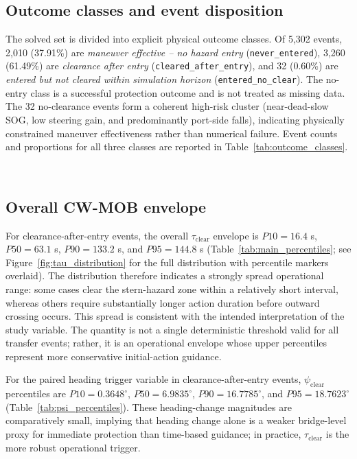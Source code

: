 \documentclass[preprint,12pt]{elsarticle}
\begin{document}
\subsection{Outcome classes and event disposition}
The solved set is divided into explicit physical outcome classes. Of 5{,}302 events, 2{,}010 (37.91\%) are \emph{maneuver effective -- no hazard entry} (\texttt{never\_entered}), 3{,}260 (61.49\%) are \emph{clearance after entry} (\texttt{cleared\_after\_entry}), and 32 (0.60\%) are \emph{entered but not cleared within simulation horizon} (\texttt{entered\_no\_clear}). The no-entry class is a successful protection outcome and is not treated as missing data.
The 32 no-clearance events form a coherent high-risk cluster (near-dead-slow SOG, low steering gain, and predominantly port-side falls), indicating physically constrained maneuver effectiveness rather than numerical failure. Event counts and proportions for all three classes are reported in Table~\ref{tab:outcome_classes}.

\begin{table}[H]
\centering
{}\
\caption{Outcome-class summary for eligible scenarios.}
\label{tab:outcome_classes}
\end{table}

\subsection{Overall CW-MOB envelope}
For clearance-after-entry events, the overall $\tau_{\mathrm{clear}}$ envelope is $P10=16.4$ s, $P50=63.1$ s, $P90=133.2$ s, and $P95=144.8$ s (Table~\ref{tab:main_percentiles}; see Figure~\ref{fig:tau_distribution} for the full distribution with percentile markers overlaid). The distribution therefore indicates a strongly spread operational range: some cases clear the stern-hazard zone within a relatively short interval, whereas others require substantially longer action duration before outward crossing occurs. This spread is consistent with the intended interpretation of the study variable. The quantity is not a single deterministic threshold valid for all transfer events; rather, it is an operational envelope whose upper percentiles represent more conservative initial-action guidance.

For the paired heading trigger variable in clearance-after-entry events, $\psi_{\mathrm{clear}}$ percentiles are $P10=0.3648^{\circ}$, $P50=6.9835^{\circ}$, $P90=16.7785^{\circ}$, and $P95=18.7623^{\circ}$ (Table~\ref{tab:psi_percentiles}).
These heading-change magnitudes are comparatively small, implying that heading change alone is a weaker bridge-level proxy for immediate protection than time-based guidance; in practice, $\tau_{\mathrm{clear}}$ is the more robust operational trigger.
\end{document}
